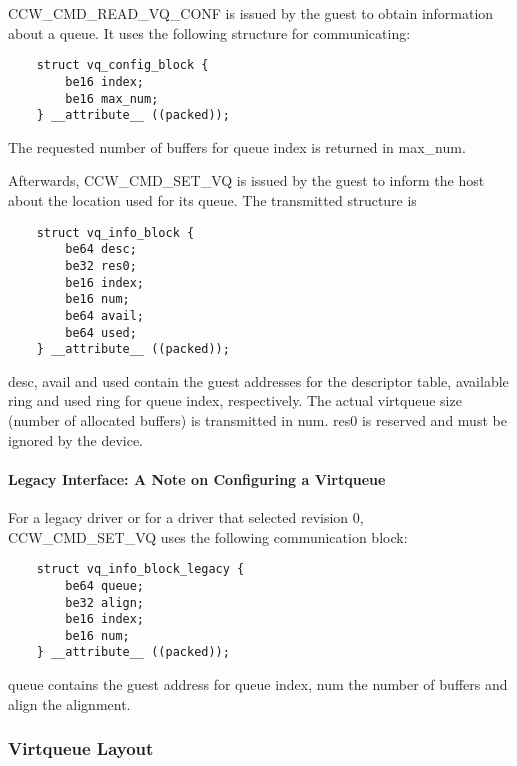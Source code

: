 CCW_CMD_READ_VQ_CONF is issued by the guest to obtain information
about a queue. It uses the following structure for communicating:

\begin{lstlisting}
	struct vq_config_block {
		be16 index;
		be16 max_num;
	} __attribute__ ((packed));
\end{lstlisting}

The requested number of buffers for queue index is returned in
max_num.

Afterwards, CCW_CMD_SET_VQ is issued by the guest to inform the
host about the location used for its queue. The transmitted
structure is

\begin{lstlisting}
	struct vq_info_block {
		be64 desc;
		be32 res0;
		be16 index;
		be16 num;
		be64 avail;
		be64 used;
	} __attribute__ ((packed));
\end{lstlisting}

desc, avail and used contain the guest addresses for the descriptor table,
available ring and used ring for queue index, respectively. The actual
virtqueue size (number of allocated buffers) is transmitted in num.
res0 is reserved and must be ignored by the device.

\paragraph{Legacy Interface: A Note on Configuring a Virtqueue}\label{sec:Virtio Transport Options / Virtio over channel I/O / Device Initialization / Configuring a Virtqueue / Legacy Interface: A Note on Configuring a Virtqueue}

For a legacy driver or for a driver that selected revision 0,
CCW_CMD_SET_VQ uses the following communication block:

\begin{lstlisting}
	struct vq_info_block_legacy {
		be64 queue;
		be32 align;
		be16 index;
		be16 num;
	} __attribute__ ((packed));
\end{lstlisting}

queue contains the guest address for queue index, num the number of buffers
and align the alignment.

\subsubsection{Virtqueue Layout}\label{sec:Virtio Transport Options / Virtio over channel I/O / Device Initialization / Virtqueue Layout}

